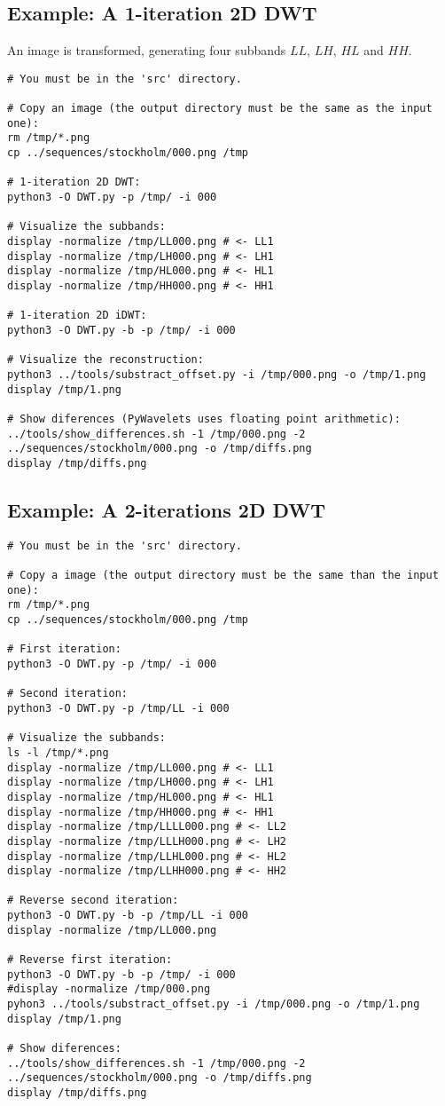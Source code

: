 \subsection*{Example: A 1-iteration 2D DWT}
An image is transformed, generating four subbands $LL$, $LH$, $HL$ and
$HH$.
\begin{verbatim}
# You must be in the 'src' directory.

# Copy an image (the output directory must be the same as the input one):
rm /tmp/*.png
cp ../sequences/stockholm/000.png /tmp

# 1-iteration 2D DWT:
python3 -O DWT.py -p /tmp/ -i 000

# Visualize the subbands:
display -normalize /tmp/LL000.png # <- LL1
display -normalize /tmp/LH000.png # <- LH1
display -normalize /tmp/HL000.png # <- HL1
display -normalize /tmp/HH000.png # <- HH1

# 1-iteration 2D iDWT:
python3 -O DWT.py -b -p /tmp/ -i 000

# Visualize the reconstruction:
python3 ../tools/substract_offset.py -i /tmp/000.png -o /tmp/1.png
display /tmp/1.png

# Show diferences (PyWavelets uses floating point arithmetic):
../tools/show_differences.sh -1 /tmp/000.png -2 ../sequences/stockholm/000.png -o /tmp/diffs.png
display /tmp/diffs.png
\end{verbatim}

\subsection*{Example: A 2-iterations 2D DWT}
\begin{verbatim}
# You must be in the 'src' directory.

# Copy a image (the output directory must be the same than the input one):
rm /tmp/*.png
cp ../sequences/stockholm/000.png /tmp

# First iteration:
python3 -O DWT.py -p /tmp/ -i 000

# Second iteration:
python3 -O DWT.py -p /tmp/LL -i 000

# Visualize the subbands:
ls -l /tmp/*.png
display -normalize /tmp/LL000.png # <- LL1  
display -normalize /tmp/LH000.png # <- LH1  
display -normalize /tmp/HL000.png # <- HL1  
display -normalize /tmp/HH000.png # <- HH1  
display -normalize /tmp/LLLL000.png # <- LL2
display -normalize /tmp/LLLH000.png # <- LH2
display -normalize /tmp/LLHL000.png # <- HL2
display -normalize /tmp/LLHH000.png # <- HH2

# Reverse second iteration:
python3 -O DWT.py -b -p /tmp/LL -i 000
display -normalize /tmp/LL000.png

# Reverse first iteration:
python3 -O DWT.py -b -p /tmp/ -i 000
#display -normalize /tmp/000.png
pyhon3 ../tools/substract_offset.py -i /tmp/000.png -o /tmp/1.png
display /tmp/1.png

# Show diferences:
../tools/show_differences.sh -1 /tmp/000.png -2 ../sequences/stockholm/000.png -o /tmp/diffs.png
display /tmp/diffs.png
\end{verbatim}

